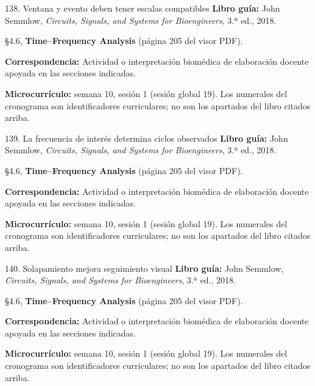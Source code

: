 \documentclass[
  10pt,
  ignorenonframetext,
  aspectratio=169,
  spanish,
]{beamer}
\begin{document}
\begin{frame}{138. Ventana y evento deben tener escalas compatibles}
\label{ventana-y-evento-deben-tener-escalas-compatibles}
\textbf{Libro guía:} John Semmlow, \emph{Circuits, Signals, and Systems
for Bioengineers}, 3.ª ed., 2018.

§4.6, \textbf{Time--Frequency Analysis} (página 205 del visor PDF).

\textbf{Correspondencia:} Actividad o interpretación biomédica de
elaboración docente apoyada en las secciones indicadas.

\textbf{Microcurrículo:} semana 10, sesión 1 (sesión global 19). Los
numerales del cronograma son identificadores curriculares; no son los
apartados del libro citados arriba.
\end{frame}

\begin{frame}{139. La frecuencia de interés determina ciclos observados}
\label{la-frecuencia-de-interuxe9s-determina-ciclos-observados}
\textbf{Libro guía:} John Semmlow, \emph{Circuits, Signals, and Systems
for Bioengineers}, 3.ª ed., 2018.

§4.6, \textbf{Time--Frequency Analysis} (página 205 del visor PDF).

\textbf{Correspondencia:} Actividad o interpretación biomédica de
elaboración docente apoyada en las secciones indicadas.

\textbf{Microcurrículo:} semana 10, sesión 1 (sesión global 19). Los
numerales del cronograma son identificadores curriculares; no son los
apartados del libro citados arriba.
\end{frame}

\begin{frame}{140. Solapamiento mejora seguimiento visual}
\label{solapamiento-mejora-seguimiento-visual}
\textbf{Libro guía:} John Semmlow, \emph{Circuits, Signals, and Systems
for Bioengineers}, 3.ª ed., 2018.

§4.6, \textbf{Time--Frequency Analysis} (página 205 del visor PDF).

\textbf{Correspondencia:} Actividad o interpretación biomédica de
elaboración docente apoyada en las secciones indicadas.

\textbf{Microcurrículo:} semana 10, sesión 1 (sesión global 19). Los
numerales del cronograma son identificadores curriculares; no son los
apartados del libro citados arriba.
\end{frame}
\end{document}
